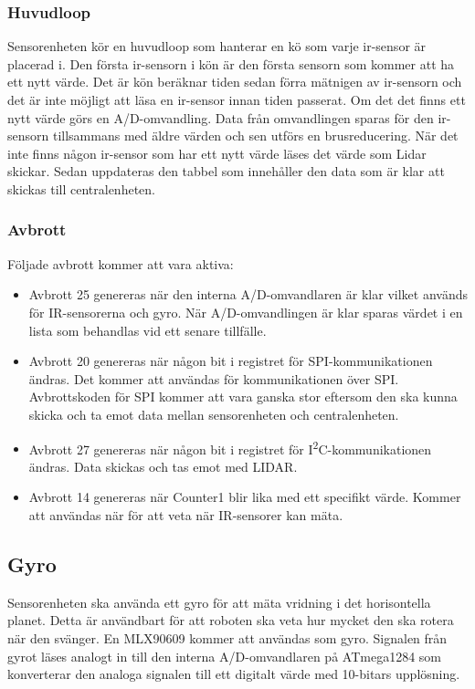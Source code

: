 \documentclass[a4paper,titlepage,12pt]{article}
\newcommand{\itc}{I\textsuperscript{2}C}
\begin{document}
    \subsubsection{Huvudloop}
    Sensorenheten kör en huvudloop som hanterar en kö som varje ir-sensor är placerad 
    i. Den första ir-sensorn i kön är den första sensorn som kommer att ha ett nytt 
    värde. Det är kön beräknar tiden sedan förra mätnigen av ir-sensorn och det är inte 
    möjligt att läsa en ir-sensor innan tiden passerat. Om det det finns ett nytt värde 
    görs en A/D-omvandling. Data från omvandlingen sparas för den ir-sensorn 
    tillsammans med äldre värden och sen utförs en brusreducering. När det inte finns 
    någon ir-sensor som har ett nytt värde läses det värde som Lidar skickar. Sedan 
    uppdateras den tabbel som innehåller den data som är klar att skickas till 
    centralenheten. 

    \subsubsection{Avbrott}
	Följade avbrott kommer att vara aktiva:
    \begin{itemize}
        \item Avbrott 25 genereras när den interna A/D-omvandlaren är klar 
            vilket används för IR-sensorerna och gyro. När A/D-omvandlingen är klar 
            sparas värdet i en lista som behandlas vid ett senare tillfälle.
        \item Avbrott 20 genereras när någon bit i registret för SPI-kommunikationen
            ändras. Det kommer att användas för kommunikationen över SPI. Avbrottskoden för 
            SPI kommer att vara ganska stor eftersom den ska kunna skicka och ta emot data 
			mellan sensorenheten och centralenheten. 
        \item Avbrott 27 genereras när någon bit i registret för \itc{}-kommunikationen 
            ändras. Data skickas och tas emot med LIDAR. 
		\item Avbrott 14 genereras när Counter1 blir lika med ett specifikt värde. 
			Kommer att användas när för att veta när IR-sensorer kan mäta. 
    \end{itemize}

	\subsection{Gyro}

	Sensorenheten ska använda ett gyro för att mäta vridning i det horisontella
	planet. Detta är användbart för att roboten ska veta hur mycket
	den ska rotera när den svänger. En MLX90609 kommer att användas som gyro. Signalen från 
	gyrot läses analogt in till den interna A/D-omvandlaren på ATmega1284 som konverterar 
	den analoga signalen till ett digitalt värde med 10-bitars upplösning. 
	
\end{document}
